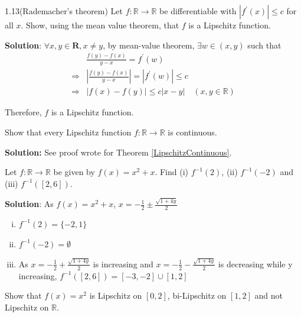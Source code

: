 \documentclass[12pt, a4paper]{article}
\begin{document}
\begin{customexercise}{1.13(Rademacher's theorem)}\label{1.13}
    Let $f: \mathbb{R} \rightarrow \mathbb{R}$ be differentiable 
    with $\left|f^{\prime}(x)\right| \leq c$ for all $x$. 
    Show, using the mean value theorem, that $f$ is a Lipschitz function.
\end{customexercise}

\textbf{Solution}: 
$\forall x, y \in \mathbf{R} , x \neq y$, by mean-value theorem, $\exists w \in(x, y)$ such that 
$$
\begin{aligned}
    &\frac{f(y)-f(x)}{y-x}=f^{\prime}(w) \\
    \Rightarrow  &\left|\frac{f(y)-f(x)}{y-x}\right|=\left|f^{\prime}(w)\right| \leq c \\
    \Rightarrow &|f(x)-f(y)| \leq c|x-y| \quad (x, y \in \mathbb{R})
\end{aligned}
$$

Therefore, $f$ is a Lipschitz function.


\begin{customexercise}{1.14}
    Show that every Lipschitz function 
    $f: \mathbb{R} \rightarrow \mathbb{R}$ is continuous.
\end{customexercise}

\textbf{Solution: } See proof wrote for Theorem \ref{LipschitzContinuous}.


\begin{customexercise}{1.15}
    Let $f: \mathbb{R} \rightarrow \mathbb{R}$ be given by $f(x)=x^{2}+x .$ 
    Find (i) $f^{-1}(2)$, (ii) $f^{-1}(-2)$ and (iii) $f^{-1}([2,6])$.
\end{customexercise}

\textbf{Solution}: As $f(x) = x^2 + x$, $\displaystyle x = -\frac{1}{2} \pm \frac{\sqrt{1 + 4y}}{2}$
\begin{enumerate}[(i)]
    \item $f^{-1}(2) = \{-2, 1\}$
    \item $f^{-1}(-2) = \emptyset$
    \item As $\displaystyle x = -\frac{1}{2} + \frac{\sqrt{1 + 4y}}{2}$ is increasing and $\displaystyle x = -\frac{1}{2} - \frac{\sqrt{1 + 4y}}{2}$ is decreasing while y increasing, 
     $f^{-1}([2,6]) = [-3, -2]\cup [1, 2]$
\end{enumerate}


\begin{customexercise}{1.16}
    Show that $f(x)=x^{2}$ is Lipschitz on $[0,2]$, bi-Lipschitz on 
    $[1,2]$ and not Lipschitz on $\mathbb{R}$.
\end{customexercise}
\end{document}

